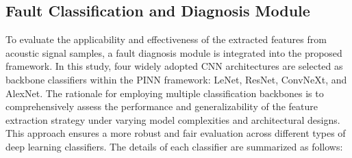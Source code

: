 \documentclass[final,5p,times,twocolumn]{elsarticle}
\begin{document}
\subsection{Fault Classification and Diagnosis Module}
To evaluate the applicability and effectiveness of the extracted features from acoustic signal samples, a fault diagnosis module is integrated into the proposed framework. In this study, four widely adopted CNN architectures are selected as backbone classifiers within the PINN framework: LeNet, ResNet, ConvNeXt, and AlexNet. The rationale for employing multiple classification backbones is to comprehensively assess the performance and generalizability of the feature extraction strategy under varying model complexities and architectural designs. This approach ensures a more robust and fair evaluation across different types of deep learning classifiers. The details of each classifier are summarized as follows:
\end{document}
